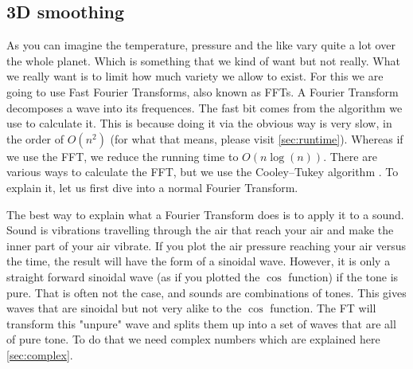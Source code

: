 \subsection{3D smoothing} \label{sec:3dsmooth}
As you can imagine the temperature, pressure and the like vary quite a lot over the whole planet. Which is something that we kind of want but not really. What we really want is to limit how 
much variety we allow to exist. For this we are going to use Fast Fourier Transforms, also known as FFTs. A Fourier Transform decomposes a wave into its frequences. The fast bit comes from the 
algorithm we use to calculate it. This is because doing it via the obvious way is very slow, in the order of $O(n^2)$ (for what that means, please visit \autoref{sec:runtime}). Whereas if we use 
the FFT, we reduce the running time to $O(n\log(n))$. There are various ways to calculate the FFT, but we use the Cooley–Tukey algorithm \cite{fft}. To explain it, let us first dive into a normal 
Fourier Transform.

The best way to explain what a Fourier Transform does is to apply it to a sound. Sound is vibrations travelling through the air that reach your air and make the inner part of your air vibrate.
If you plot the air pressure reaching your air versus the time, the result will have the form of a sinoidal wave. However, it is only a straight forward sinoidal wave (as if you plotted the 
$\cos$ function) if the tone is pure. That is often not the case, and sounds are combinations of tones. This gives waves that are sinoidal but not very alike to the $\cos$ function. The FT will
transform this "unpure" wave and splits them up into a set of waves that are all of pure tone. To do that we need complex numbers which are explained here \autoref{sec:complex}. 

